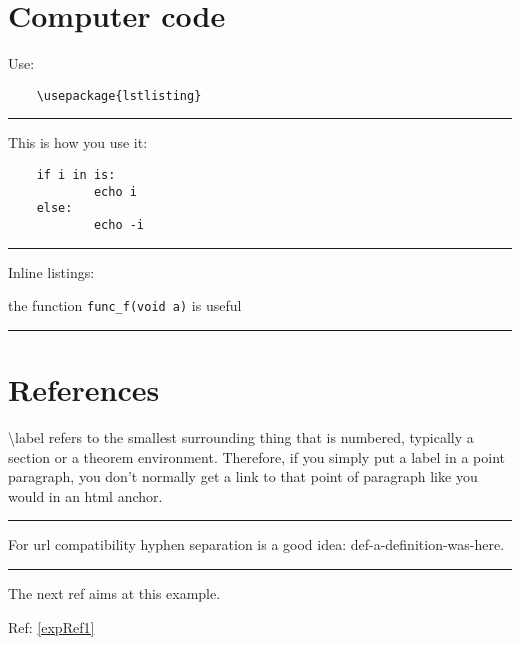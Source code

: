 \documentclass[12pt]{article}
\newcommand{\inOut}[1]{#1}                                %
\begin{document}
\section{Computer code}\label{secCode}

    \begin{remark} \label{remCode1}
        Use:
        \begin{lstlisting}
    \usepackage{lstlisting}
        \end{lstlisting}
    \end{remark}\hrule

    \begin{example} \label{expLst1}
        This is how you use it:
            \begin{lstlisting}
    if i in is:
            echo i
    else:
            echo -i
            \end{lstlisting}
    \end{example}\hrule

    \begin{example} \label{expLst2}
        Inline listings:

            the function \lstinline|func_f(void a)| is useful
    \end{example}\hrule

    \section{References}\label{secRef}

    \begin{remark} \label{remLab1}
        \textbackslash{}label refers to the smallest surrounding thing that is numbered, typically a section or a theorem environment. Therefore, if you simply put a label in a point paragraph, you don't normally get a link to that point of paragraph like you would in an html anchor.
    \end{remark}\hrule

    \begin{remark} \label{remLab2}
        For url compatibility hyphen separation is a good idea: def-a-definition-was-here.
    \end{remark}\hrule

    \begin{example} \label{expRef1}
        \inOut{
            The next ref aims at this example.

            Ref: \ref{expRef1}
        }
    \end{example}
\end{document}
